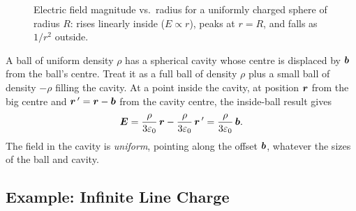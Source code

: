 \begin{example}
\begin{figure}[H]
\begin{center}
\end{center}
\caption{Electric field magnitude vs.\ radius for a uniformly charged sphere of radius $R$: rises linearly inside ($E \propto r$), peaks at $r=R$, and falls as $1/r^2$ outside.}
\end{figure}
\end{example}

\begin{example}
A ball of uniform density $\rho$ has a spherical cavity whose centre is displaced by $\bm{b}$ from the ball's centre. Treat it as a full ball of density $\rho$ plus a small ball of density $-\rho$ filling the cavity. At a point inside the cavity, at position $\bm{r}$ from the big centre and $\bm{r}\,'=\bm{r}-\bm{b}$ from the cavity centre, the inside-ball result gives
\[
    \vect{E} = \frac{\rho}{3\varepsilon_0}\,\lvect{r} - \frac{\rho}{3\varepsilon_0}\,\lvect{r}\,' = \frac{\rho}{3\varepsilon_0}\,\lvect{b}.
\]
The field in the cavity is \emph{uniform}, pointing along the offset $\bm{b}$, whatever the sizes of the ball and cavity.
\end{example}

\subsection{Example: Infinite Line Charge}

